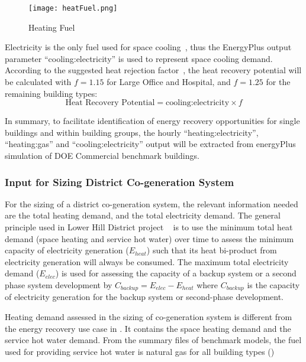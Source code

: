 \begin{figure}[h!]
  \centering
  \texttt{[image: heatFuel.png]}
  \caption[Heating Fuel]{Heating Fuel}
  \label{fig:heatFuel}
\end{figure}

Electricity is the only fuel used for space cooling~\cite{DOE2015},
thus the EnergyPlus output parameter ``cooling:electricity'' is used
to represent space cooling demand. According to the suggested heat
rejection factor~\cite{Bhatia2015}, the heat recovery potential will
be calculated with $f = 1.15$ for Large Office and Hospital, and
$f = 1.25$ for the remaining building types:
\begin{equation}\label{eq:recover}
\text{Heat Recovery Potential} = \text{cooling:electricity} \times f
\end{equation}

In summary, to facilitate identification of energy recovery
opportunities for single buildings and within building groups, the
hourly ``heating:electricity'', ``heating:gas'' and
``cooling:electricity'' output will be extracted from energyPlus
simulation of DOE Commercial benchmark buildings.

\subsubsection{Input for Sizing District Co-generation
  System}
For the sizing of a district co-generation system, the relevant
information needed are the total heating demand, and the total
electricity demand. The general principle used in Lower Hill District
project ~\cite{baird2014} is to use the minimum total heat demand
(space heating and service hot water) over time to assess the minimum
capacity of electricity generation ($E_{heat}$) such that its heat
bi-product from electricity generation will always be consumed. The
maximum total electricity demand ($E_{elec}$) is used for assessing
the capacity of a backup system or a second phase system development
by $C_{backup} = E_{elec} - E_{heat}$ where $C_{backup}$ is the
capacity of electricity generation for the backup system or
second-phase development.

Heating demand assessed in the sizing of co-generation system is
different from the energy recovery use case in 
. It contains the space heating demand and the service hot water
demand. From the summary files of benchmark models, the fuel used for
providing service hot water is natural gas for all building types
()

